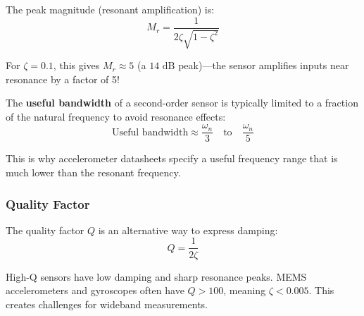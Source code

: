 The peak magnitude (resonant amplification) is:
\begin{equation}
M_r = \frac{1}{2\zeta\sqrt{1-\zeta^2}}
\label{eq:resonant_peak}
\end{equation}

For $\zeta = 0.1$, this gives $M_r \approx 5$ (a $14\text{ dB}$ peak)---the sensor amplifies inputs near resonance by a factor of 5!

The \textbf{useful bandwidth} of a second-order sensor is typically limited to a fraction of the natural frequency to avoid resonance effects:
\begin{equation}
\text{Useful bandwidth} \approx \frac{\omega_n}{3} \quad \text{to} \quad \frac{\omega_n}{5}
\label{eq:useful_bandwidth}
\end{equation}

This is why accelerometer datasheets specify a useful frequency range that is much lower than the resonant frequency.

\subsubsection{Quality Factor}

The quality factor $Q$ is an alternative way to express damping:
\begin{equation}
Q = \frac{1}{2\zeta}
\label{eq:quality_factor}
\end{equation}

High-Q sensors have low damping and sharp resonance peaks. MEMS accelerometers and gyroscopes often have $Q > 100$, meaning $\zeta < 0.005$. This creates challenges for wideband measurements.

